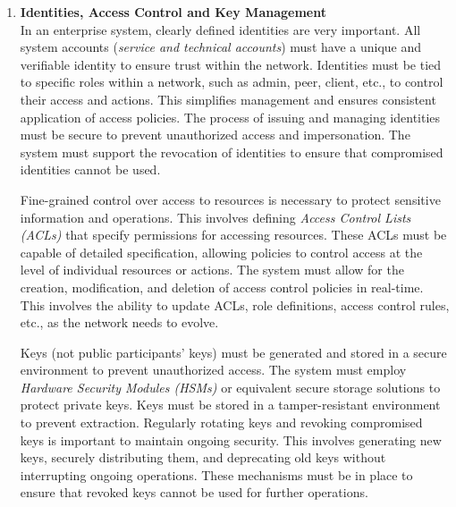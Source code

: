 \begin{enumerate}[label=\textbullet]
	\item\textbf{Identities, Access Control and Key Management}\cite{nist_pub_key_mgmt}\cite{sub_acc_add_key}\cite{nist_pub_bloc_acc_ctrl}\cite{hype_dkms}\\
	In an enterprise system, clearly defined identities are very important. All system accounts (\textit{service and technical accounts}) must have a unique and verifiable identity to ensure trust within the network. Identities must be tied to specific roles within a network, such as admin, peer, client, etc., to control their access and actions. This simplifies management and ensures consistent application of access policies. The process of issuing and managing identities must be secure to prevent unauthorized access and impersonation. The system must support the revocation of identities to ensure that compromised identities cannot be used. 
	
	Fine-grained control over access to resources is necessary to protect sensitive information and operations. This involves defining \textit{Access Control Lists (ACLs)} that specify permissions for accessing resources. These ACLs must be capable of detailed specification, allowing policies to control access at the level of individual resources or actions. The system must allow for the creation, modification, and deletion of access control policies in real-time. This involves the ability to update ACLs, role definitions, access control rules, etc., as the network needs to evolve.
	
	Keys (not public participants' keys) must be generated and stored in a secure environment to prevent unauthorized access. The system must employ \textit{Hardware Security Modules (HSMs)} or equivalent secure storage solutions to protect private keys. Keys must be stored in a tamper-resistant environment to prevent extraction. Regularly rotating keys and revoking compromised keys is important to maintain ongoing security. This involves generating new keys, securely distributing them, and deprecating old keys without interrupting ongoing operations. These mechanisms must be in place to ensure that revoked keys cannot be used for further operations.


\end{enumerate}
